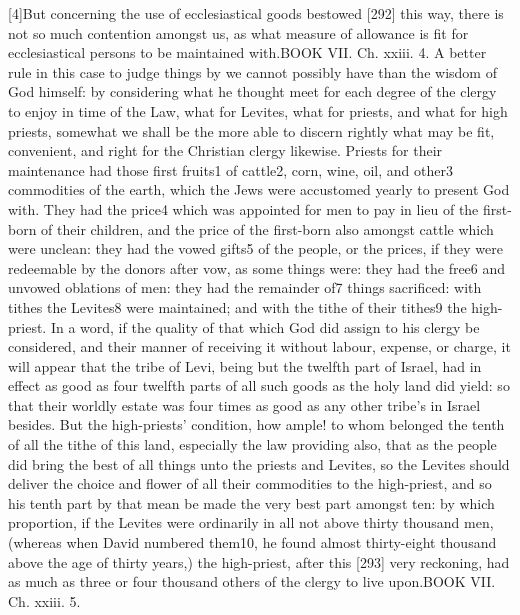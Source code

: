 [4]But concerning the use of ecclesiastical goods bestowed [292] this way, there is not so much contention amongst us, as what measure of allowance is fit for ecclesiastical persons to be maintained with.BOOK VII. Ch. xxiii. 4. A better rule in this case to judge things by we cannot possibly have than the wisdom of God himself: by considering what he thought meet for each degree of the clergy to enjoy in time of the Law, what for Levites, what for priests, and what for high priests, somewhat we shall be the more able to discern rightly what may be fit, convenient, and right for the Christian clergy likewise. Priests for their maintenance had those first fruits1 of cattle2, corn, wine, oil, and other3 commodities of the earth, which the Jews were accustomed yearly to present God with. They had the price4 which was appointed for men to pay in lieu of the first-born of their children, and the price of the first-born also amongst cattle which were unclean: they had the vowed gifts5 of the people, or the prices, if they were redeemable by the donors after vow, as some things were: they had the free6 and unvowed oblations of men: they had the remainder of7 things sacrificed: with tithes the Levites8 were maintained; and with the tithe of their tithes9 the high-priest. In a word, if the quality of that which God did assign to his clergy be considered, and their manner of receiving it without labour, expense, or charge, it will appear that the tribe of Levi, being but the twelfth part of Israel, had in effect as good as four twelfth parts of all such goods as the holy land did yield: so that their worldly estate was four times as good as any other tribe’s in Israel besides. But the high-priests’ condition, how ample! to whom belonged the tenth of all the tithe of this land, especially the law providing also, that as the people did bring the best of all things unto the priests and Levites, so the Levites should deliver the choice and flower of all their commodities to the high-priest, and so his tenth part by that mean be made the very best part amongst ten: by which proportion, if the Levites were ordinarily in all not above thirty thousand men, (whereas when David numbered them10, he found almost thirty-eight thousand above the age of thirty years,) the high-priest, after this [293] very reckoning, had as much as three or four thousand others of the clergy to live upon.BOOK VII. Ch. xxiii. 5.

